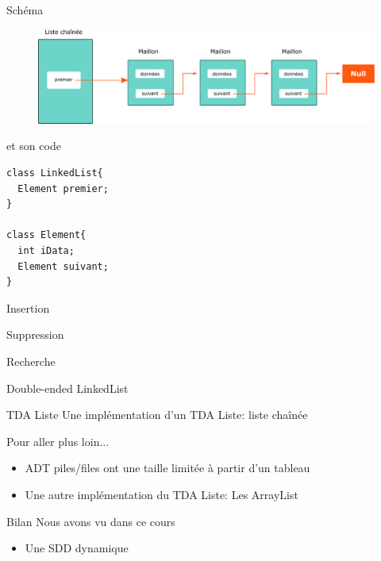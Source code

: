 \documentclass[12pt,a4paper]{beamer}
\begin{document}
\begin{frame}{Schéma}
\begin{figure}
\includegraphics[scale=0.35]{figs/linked_list}
\end{figure}

\end{frame}

\begin{frame}[fragile]{et son code}
\begin{lstlisting}
class LinkedList{
  Element premier;
}

class Element{
  int iData;
  Element suivant;
}
\end{lstlisting}
\end{frame}

\begin{frame}{Insertion}
\end{frame}

\begin{frame}{Suppression}
\end{frame}

\begin{frame}{Recherche}
\end{frame}


\begin{frame}{Double-ended LinkedList}
\end{frame}



\begin{frame}{TDA Liste}
Une implémentation d'un TDA Liste: liste chaînée
\end{frame}

\begin{frame}{Pour aller plus loin...}
\begin{itemize}
\item ADT piles/files ont une taille limitée à partir d'un tableau
\item Une autre implémentation du TDA Liste: Les ArrayList
\end{itemize}
\end{frame}



\begin{frame}{Bilan}
Nous avons vu dans ce cours
\begin{itemize}
\item Une SDD dynamique
\end{itemize}
\end{frame}
\end{document}
